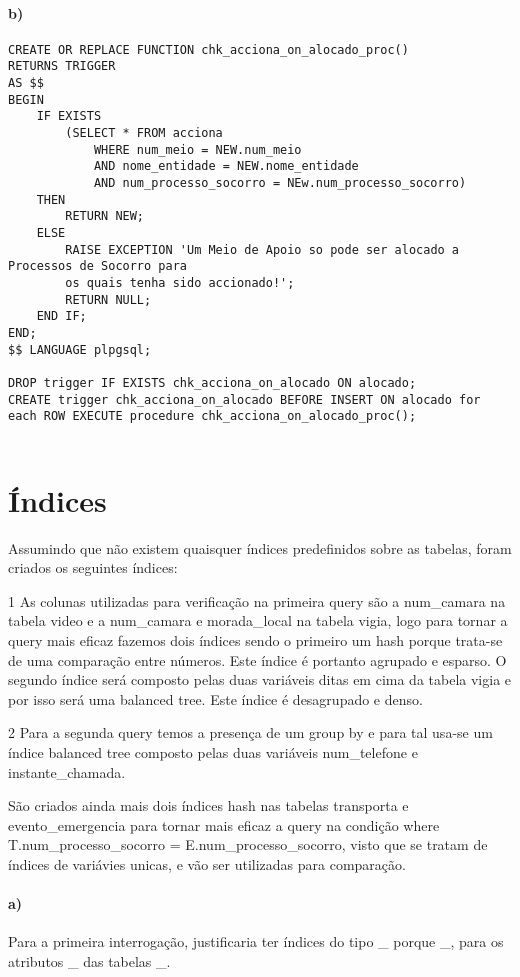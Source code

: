 \documentclass[10pt,a4paper]{article}
\begin{document}
\paragraph{b)}
\begin{verbatim}
CREATE OR REPLACE FUNCTION chk_acciona_on_alocado_proc()
RETURNS TRIGGER
AS $$
BEGIN
    IF EXISTS
        (SELECT * FROM acciona
            WHERE num_meio = NEW.num_meio
            AND nome_entidade = NEW.nome_entidade
            AND num_processo_socorro = NEw.num_processo_socorro)
    THEN
        RETURN NEW;
    ELSE
        RAISE EXCEPTION 'Um Meio de Apoio so pode ser alocado a Processos de Socorro para
        os quais tenha sido accionado!';
        RETURN NULL;
    END IF;
END;
$$ LANGUAGE plpgsql;

DROP trigger IF EXISTS chk_acciona_on_alocado ON alocado;
CREATE trigger chk_acciona_on_alocado BEFORE INSERT ON alocado for each ROW EXECUTE procedure chk_acciona_on_alocado_proc();
    
\end{verbatim}
\section{Índices}
Assumindo que não existem quaisquer índices predefinidos sobre as tabelas, foram criados os seguintes índices: 

1  As colunas utilizadas para verificação na primeira query são a num\_camara na tabela video e a num\_camara e morada\_local na tabela vigia, logo para tornar a query mais eficaz fazemos dois índices sendo o primeiro um hash porque trata-se de uma comparação entre números. Este índice é portanto agrupado e esparso. O segundo índice será composto pelas duas variáveis ditas em cima da tabela vigia e por isso será uma balanced tree. Este índice é desagrupado e denso. 

2 Para a segunda query temos a presença de um group by e para tal usa-se um índice balanced tree composto pelas duas variáveis num\_telefone e instante\_chamada. 

São criados ainda mais dois índices hash nas tabelas transporta e evento\_emergencia para tornar mais eficaz a query na condição where T.num\_processo\_socorro = E.num\_processo\_socorro, visto que se tratam de índices de variávies unicas, e vão ser utilizadas para comparação. 

\paragraph{a)}
Para a primeira interrogação, justificaria ter índices do tipo \_ porque \_, para os atributos \_ das tabelas \_.
\end{document}
